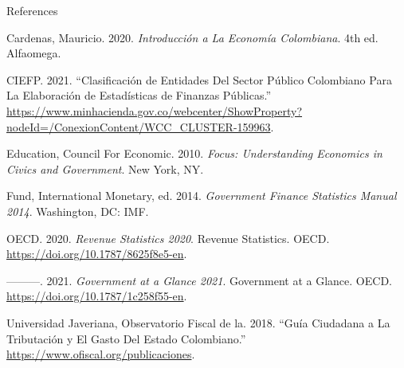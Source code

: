 \documentclass[
  ignorenonframetext,
  english,
]{beamer}
\newlength{\cslhangindent}
\newenvironment{CSLReferences}[2] %
 {\begin{list}{}{%
  \setlength{\itemindent}{0pt}
  \setlength{\leftmargin}{0pt}
  \setlength{\parsep}{0pt}
  \ifodd #1
   \setlength{\leftmargin}{\cslhangindent}
   \setlength{\itemindent}{-1\cslhangindent}
  \fi
  \setlength{\itemsep}{#2\baselineskip}}}
 {\end{list}}
\begin{document}
\begin{frame}[allowframebreaks]{References}
\label{refs}
\begin{CSLReferences}{1}{0}
Cardenas, Mauricio. 2020. \emph{Introducción a La {Economía}
{Colombiana}}. 4th ed. Alfaomega.

CIEFP. 2021. {``Clasificación de Entidades Del {Sector} {Público}
Colombiano Para La Elaboración de {Estadísticas} de {Finanzas}
{Públicas}.''}
\url{https://www.minhacienda.gov.co/webcenter/ShowProperty?nodeId=/ConexionContent/WCC_CLUSTER-159963}.

Education, Council For Economic. 2010. \emph{Focus: {Understanding}
Economics in Civics and Government}. New York, NY.

Fund, International Monetary, ed. 2014. \emph{Government Finance
Statistics Manual 2014}. Washington, DC: IMF.

OECD. 2020. \emph{Revenue {Statistics} 2020}. Revenue {Statistics}.
OECD. \url{https://doi.org/10.1787/8625f8e5-en}.

---------. 2021. \emph{Government at a {Glance} 2021}. Government at a
{Glance}. OECD. \url{https://doi.org/10.1787/1c258f55-en}.

Universidad Javeriana, Observatorio Fiscal de la. 2018. {``Guía
Ciudadana a La Tributación y El Gasto Del {Estado} Colombiano.''}
\url{https://www.ofiscal.org/publicaciones}.

\end{CSLReferences}
\end{frame}
\end{document}
